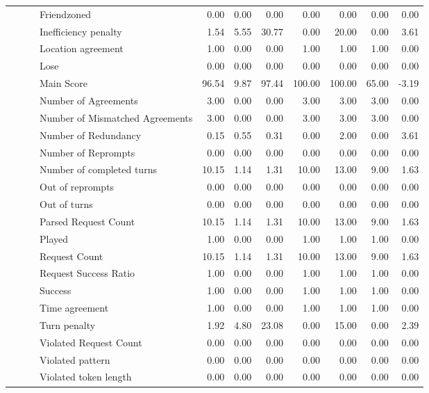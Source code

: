 \begin{tabular}{llllrrrrrrr}
 &  &  & Friendzoned & 0.00 & 0.00 & 0.00 & 0.00 & 0.00 & 0.00 & 0.00 \\
 &  &  & Inefficiency penalty & 1.54 & 5.55 & 30.77 & 0.00 & 20.00 & 0.00 & 3.61 \\
 &  &  & Location agreement & 1.00 & 0.00 & 0.00 & 1.00 & 1.00 & 1.00 & 0.00 \\
 &  &  & Lose & 0.00 & 0.00 & 0.00 & 0.00 & 0.00 & 0.00 & 0.00 \\
 &  &  & Main Score & 96.54 & 9.87 & 97.44 & 100.00 & 100.00 & 65.00 & -3.19 \\
 &  &  & Number of Agreements & 3.00 & 0.00 & 0.00 & 3.00 & 3.00 & 3.00 & 0.00 \\
 &  &  & Number of Mismatched Agreements & 3.00 & 0.00 & 0.00 & 3.00 & 3.00 & 3.00 & 0.00 \\
 &  &  & Number of Redundancy & 0.15 & 0.55 & 0.31 & 0.00 & 2.00 & 0.00 & 3.61 \\
 &  &  & Number of Reprompts & 0.00 & 0.00 & 0.00 & 0.00 & 0.00 & 0.00 & 0.00 \\
 &  &  & Number of completed turns & 10.15 & 1.14 & 1.31 & 10.00 & 13.00 & 9.00 & 1.63 \\
 &  &  & Out of reprompts & 0.00 & 0.00 & 0.00 & 0.00 & 0.00 & 0.00 & 0.00 \\
 &  &  & Out of turns & 0.00 & 0.00 & 0.00 & 0.00 & 0.00 & 0.00 & 0.00 \\
 &  &  & Parsed Request Count & 10.15 & 1.14 & 1.31 & 10.00 & 13.00 & 9.00 & 1.63 \\
 &  &  & Played & 1.00 & 0.00 & 0.00 & 1.00 & 1.00 & 1.00 & 0.00 \\
 &  &  & Request Count & 10.15 & 1.14 & 1.31 & 10.00 & 13.00 & 9.00 & 1.63 \\
 &  &  & Request Success Ratio & 1.00 & 0.00 & 0.00 & 1.00 & 1.00 & 1.00 & 0.00 \\
 &  &  & Success & 1.00 & 0.00 & 0.00 & 1.00 & 1.00 & 1.00 & 0.00 \\
 &  &  & Time agreement & 1.00 & 0.00 & 0.00 & 1.00 & 1.00 & 1.00 & 0.00 \\
 &  &  & Turn penalty & 1.92 & 4.80 & 23.08 & 0.00 & 15.00 & 0.00 & 2.39 \\
 &  &  & Violated Request Count & 0.00 & 0.00 & 0.00 & 0.00 & 0.00 & 0.00 & 0.00 \\
 &  &  & Violated pattern & 0.00 & 0.00 & 0.00 & 0.00 & 0.00 & 0.00 & 0.00 \\
 &  &  & Violated token length & 0.00 & 0.00 & 0.00 & 0.00 & 0.00 & 0.00 & 0.00 \\

\end{tabular}
